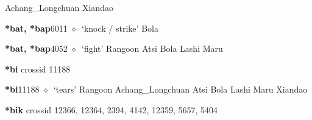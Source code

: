 \begin{list}{}{\leftmargin=1.5em \itemindent=-1.5em}
         Achang\_Longchuan 
\hspace{1ex}
         Xiandao 
  \item {\footnotesize \textbf{*bat, *bap}}{\tiny 6011}
\hspace{1ex}
         $\diamond$~`knock / strike'
         Bola 
  \item {\footnotesize \textbf{*bat, *bap}}{\tiny 4052}
\hspace{1ex}
         $\diamond$~`fight'
         Rangoon 
\hspace{1ex}
         Atsi 
\hspace{1ex}
         Bola 
\hspace{1ex}
         Lashi 
\hspace{1ex}
         Maru 
  \end{list}
\item
\textbf{*bi}
  {\tiny crossid 11188}
  \begin{list}{}{\leftmargin=1.5em \itemindent=-1.5em}
  \item {\footnotesize \textbf{*bi}}{\tiny 11188}
         $\diamond$~`tears'
         Rangoon 
\hspace{1ex}
         Achang\_Longchuan 
\hspace{1ex}
         Atsi 
\hspace{1ex}
         Bola 
\hspace{1ex}
         Lashi 
\hspace{1ex}
         Maru 
\hspace{1ex}
         Xiandao 
  \end{list}
\item
\textbf{*bik}
  {\tiny crossid 12366, 12364, 2394, 4142, 12359, 5657, 5404}
